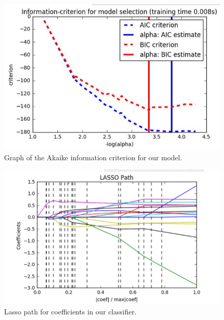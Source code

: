 \documentclass[12pt,twoside]{article}
\begin{document}
\begin{figure} \label{figure7} 
\centerline{\includegraphics[scale=0.8]{alpha.jpg}}
\caption{Graph of the Akaike information criterion for our model. }
\end{figure}

\begin{figure} \label{figure8} 
\centerline{\includegraphics[scale=0.8]{coefficients.jpg}}
\caption{Lasso path for coefficients in our classifier. }
\end{figure}
\newpage 
\end{document}
